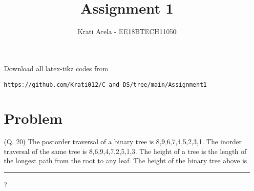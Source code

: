 \documentclass[journal,12pt,twocolumn]{IEEEtran}
\begin{document}
     \def\rightbox#1{\makebox[0in][r]{#1}}
     \def\centbox#1{\makebox[0in]{#1}}
     \def\topbox#1{\raisebox{-\baselineskip}[0in][0in]{#1}}
     \def\midbox#1{\raisebox{-0.5\baselineskip}[0in][0in]{#1}}
\vspace{3cm}
\title{Assignment 1}
\author{Krati Arela - EE18BTECH11050}
\maketitle
\newpage
\bigskip
\renewcommand{\thefigure}{\theenumi}
\renewcommand{\thetable}{\theenumi}
Download all latex-tikz codes from 
%
\begin{lstlisting}
https://github.com/Krati012/C-and-DS/tree/main/Assignment1
\end{lstlisting}
\section{Problem}
(Q. 20) The postorder traversal of a binary tree is 8,9,6,7,4,5,2,3,1. The inorder traversal of the same tree is 8,6,9,4,7,2,5,1,3. The height of a tree is the length of the longest path from the root to any leaf. The height of the binary tree above is \rule{1cm}{0.15mm}?
\end{document}
